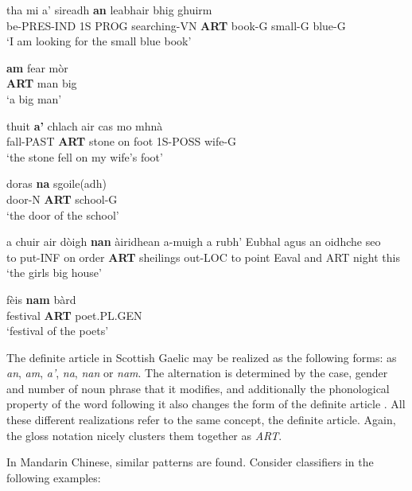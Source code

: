 \begin{exe}  
\ex 
\gll tha mi a' sireadh \textbf{an} leabhair bhig ghuirm\\
be-PRES-IND 1S PROG searching-VN \textbf{ART} book-G small-G blue-G\\
\glt `I am looking for the small blue book' \citep[p. 29]{lamb2001scottish}

\ex 
\gll \textbf{am} fear m\`or\\
\textbf{ART} man big\\
\glt `a big man' \citep[p. 31]{lamb2001scottish}

\ex
\gll thuit \textbf{a'} chlach air cas mo mhn\`a\\
fall-PAST \textbf{ART} stone on foot 1S-POSS wife-G\\
\glt`the stone fell on my wife's foot' \citep[p. 30]{lamb2001scottish} 	

\ex
\gll doras \textbf{na} sgoile(adh) \\
door-N \textbf{ART} school-G \\
\glt `the door of the school' \citep[p. 29]{lamb2001scottish} 	

\ex 
\gll a chuir air d\`oigh \textbf{nan} \`airidhean a-muigh a rubh' Eubhal agus an oidhche seo \\
to put-INF on order \textbf{ART} sheilings out-LOC to point Eaval and ART night this \\
\glt `the girls big house' \citep[p. 100]{lamb2001scottish} 

\ex
\gll f\`eis \textbf{nam} b\`ard\\
festival \textbf{ART} poet.PL.GEN\\
\glt `festival of the poets' \citep[p. 107]{lamb2001scottish}

\end{exe}

The definite article in Scottish Gaelic may be realized as the following forms: as \textit{an}, \textit{am}, \textit{a'}, \textit{na}, \textit{nan} or \textit{nam}. The alternation is determined by the case, gender and number of noun phrase that it modifies, and additionally the phonological property of the word following it also changes the form of the definite article \citep{lamb2001scottish}. All these different realizations refer to the same concept, the definite article. Again, the gloss notation nicely clusters them together as \textit{ART}. 

In Mandarin Chinese, similar patterns are found. Consider classifiers in the following examples:


